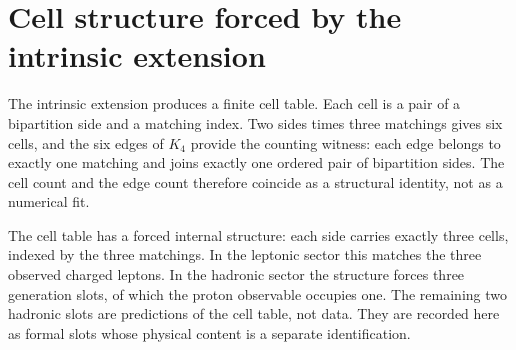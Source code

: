 \documentclass[11pt]{article}
\begin{document}
\section{Cell structure forced by the intrinsic extension}

The intrinsic extension produces a finite cell table.  Each cell is a
pair of a bipartition side and a matching index.  Two sides times three
matchings gives six cells, and the six edges of $K_4$ provide the
counting witness: each edge belongs to exactly one matching and joins
exactly one ordered pair of bipartition sides.  The cell count and the
edge count therefore coincide as a structural identity, not as a
numerical fit.

The cell table has a forced internal structure: each side carries
exactly three cells, indexed by the three matchings.  In the leptonic
sector this matches the three observed charged leptons.  In the
hadronic sector the structure forces three generation slots, of which
the proton observable occupies one.  The remaining two hadronic slots
are predictions of the cell table, not data.  They are recorded here as
formal slots whose physical content is a separate identification.
\end{document}
